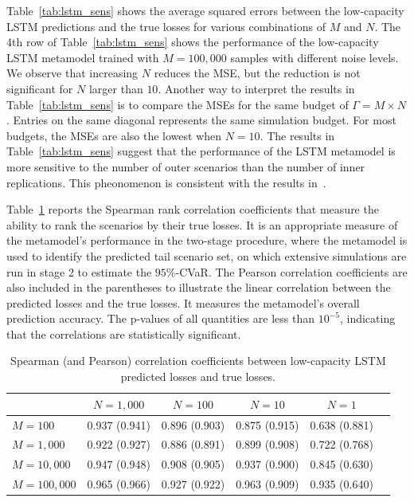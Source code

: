 \documentclass{article}
\begin{document}
Table~\ref{tab:lstm_sens} shows the average squared errors between the low-capacity LSTM predictions and the true losses for various combinations of $M$ and $N$.
The 4th row of Table~\ref{tab:lstm_sens} shows the performance of the low-capacity LSTM metamodel trained with $M=100\!,000$ samples with different noise levels.
We observe that increasing $N$ reduces the MSE, but the reduction is not significant for $N$ larger than $10$.
Another way to interpret the results in Table~\ref{tab:lstm_sens} is to compare the MSEs for the same budget of $\Gamma = M \times N$.
Entries on the same diagonal represents the same simulation budget.
For most budgets, the MSEs are also the lowest when $N = 10$.
The results in Table~\ref{tab:lstm_sens} suggest that the performance of the LSTM metamodel is more sensitive to the number of outer scenarios than the number of inner replications.
This pheonomenon is consistent with the results in~\cite{broadie2015risk}.

Table~\ref{tab:lstm_corr} reports the Spearman rank correlation coefficients that measure the ability to rank the scenarios by their true losses.
It is an appropriate measure of the metamodel's performance in the two-stage procedure, where the metamodel is used to identify the predicted tail scenario set, on which extensive simulations are run in stage 2 to estimate the $95\%$-CVaR.
The Pearson correlation coefficients are also included in the parentheses to illustrate the linear correlation between the predicted losses and the true losses.
It measures the metamodel's overall prediction accuracy.
The p-values of all quantities are less than $10^{-5}$, indicating that the correlations are statistically significant.

\begin{table}[ht!]
    \small
    \centering
    \begin{tabular}{lccccc}
        \toprule
                          & $N=1\!,\!000$ & $N=100$       & $N=10$        & $N=1$ \\
        \midrule
        $M = 100$         & 0.937 (0.941) & 0.896 (0.903) & 0.875 (0.915) & 0.638 (0.881) \\
        $M = 1\!,\!000$   & 0.922 (0.927) & 0.886 (0.891) & 0.899 (0.908) & 0.722 (0.768) \\
        $M = 10\!,\!000$  & 0.947 (0.948) & 0.908 (0.905) & 0.937 (0.900) & 0.845 (0.630) \\
        $M = 100\!,\!000$ & 0.965 (0.966) & 0.927 (0.922) & 0.963 (0.909) & 0.935 (0.640) \\
        \bottomrule
    \end{tabular}
    \caption{Spearman (and Pearson) correlation coefficients between low-capacity LSTM predicted losses and true losses.}
    \label{tab:lstm_corr}
\end{table}
\end{document}
